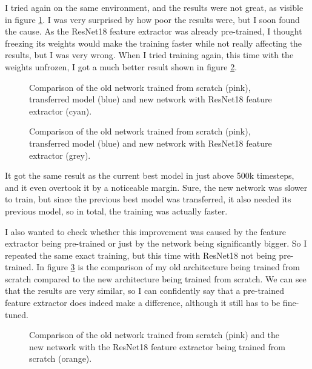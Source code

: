 \documentclass[
  digital,     %
  oneside,     %
  nosansbold,  %
  nocolorbold, %
  lof,         %
  lot,         %
]{fithesis4}
\begin{document}
I tried again on the same environment, and the results were not great, as visible in figure \ref{fig:v4_resnet_frozen}. I was very surprised by how poor the results were, but I soon found the cause. As the ResNet18 feature extractor was already pre-trained, I thought freezing its weights would make the training faster while not really affecting the results, but I was very wrong. When I tried training again, this time with the weights unfrozen, I got a much better result shown in figure \ref{fig:v4_resnet_finetune}.

\begin{figure}
    \centering
    \makebox[\textwidth][c]{}
    \caption{Comparison of the old network trained from scratch (pink), transferred model (blue) and new network with ResNet18 feature extractor (cyan).}
    \label{fig:v4_resnet_frozen}
\end{figure}

\begin{figure}
    \centering
    \makebox[\textwidth][c]{}
    \caption{Comparison of the old network trained from scratch (pink), transferred model (blue) and new network with ResNet18 feature extractor (grey).}
    \label{fig:v4_resnet_finetune}
\end{figure}

It got the same result as the current best model in just above 500k timesteps, and it even overtook it by a noticeable margin. Sure, the new network was slower to train, but since the previous best model was transferred, it also needed its previous model, so in total, the training was actually faster.

I also wanted to check whether this improvement was caused by the feature extractor being pre-trained or just by the network being significantly bigger. So I repeated the same exact training, but this time with ResNet18 not being pre-trained. In figure \ref{fig:v4_resnet_from_scratch} is the comparison of my old architecture being trained from scratch compared to the new architecture being trained from scratch. We can see that the results are very similar, so I can confidently say that a pre-trained feature extractor does indeed make a difference, although it still has to be fine-tuned.

\begin{figure}
    \centering
    \makebox[\textwidth][c]{}
    \caption{Comparison of the old network trained from scratch (pink) and the new network with the ResNet18 feature extractor being trained from scratch (orange).}
    \label{fig:v4_resnet_from_scratch}
\end{figure}
\end{document}
